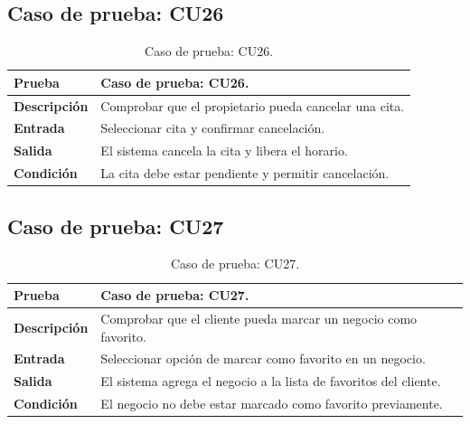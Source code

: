 
\subsection{Caso de prueba: CU26}

\begin{table}[ht]
\centering
\renewcommand{\arraystretch}{1.3}
\begin{tabular}{|p{3cm}|p{12cm}|}
\hline
\rowcolor[RGB]{191,191,191}
\textbf{Prueba} & Caso de prueba: CU26. \\
\hline
\textbf{Descripción} \cellcolor[RGB]{217,217,217} & Comprobar que el propietario pueda cancelar una cita. \\
\hline
\textbf{Entrada} \cellcolor[RGB]{217,217,217} & Seleccionar cita y confirmar cancelación. \\
\hline
\textbf{Salida} \cellcolor[RGB]{217,217,217} & El sistema cancela la cita y libera el horario. \\
\hline
\textbf{Condición} \cellcolor[RGB]{217,217,217} & La cita debe estar pendiente y permitir cancelación. \\
\hline
\end{tabular}
\caption{Caso de prueba: CU26.}
\label{tab:cu26_black_test}
\end{table}


\subsection{Caso de prueba: CU27}

\begin{table}[ht]
\centering
\renewcommand{\arraystretch}{1.3}
\begin{tabular}{|p{3cm}|p{12cm}|}
\hline
\rowcolor[RGB]{191,191,191}
\textbf{Prueba} & Caso de prueba: CU27. \\
\hline
\textbf{Descripción} \cellcolor[RGB]{217,217,217} & Comprobar que el cliente pueda marcar un negocio como favorito. \\
\hline
\textbf{Entrada} \cellcolor[RGB]{217,217,217} & Seleccionar opción de marcar como favorito en un negocio. \\
\hline
\textbf{Salida} \cellcolor[RGB]{217,217,217} & El sistema agrega el negocio a la lista de favoritos del cliente. \\
\hline
\textbf{Condición} \cellcolor[RGB]{217,217,217} & El negocio no debe estar marcado como favorito previamente. \\
\hline
\end{tabular}
\caption{Caso de prueba: CU27.}
\label{tab:cu27_black_test}
\end{table}

